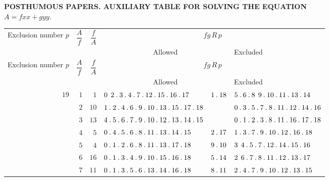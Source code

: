 \clearpage{}
\renewcommand{\BookRunningTitle}{Auxiliary Table for Solving the Equation}
\begin{center}\small
\textbf{POSTHUMOUS PAPERS. AUXILIARY TABLE FOR SOLVING THE EQUATION}\\[.4em]
$A=fxx+gyy.$
\end{center}
\begingroup\fontsize{8.7}{10.4}\selectfont\setlength{\tabcolsep}{2pt}\renewcommand{\arraystretch}{1.00}
\begin{longtable}{r|r|r|p{125pt}|p{28pt}|p{125pt}}
\hline
\shortstack{Exclusion\\number\\$p$} & $\dfrac{A}{f}$ & $\dfrac{f}{A}$ & \multicolumn{3}{c}{$fg\,R\,p$}\\\cline{4-6}
& & & \multicolumn{2}{c|}{Allowed} & Excluded\\\hline
\endfirsthead
\shortstack{Exclusion\\number\\$p$} & $\dfrac{A}{f}$ & $\dfrac{f}{A}$ & \multicolumn{3}{c}{$fg\,R\,p$}\\\cline{4-6}
& & & \multicolumn{2}{c|}{Allowed} & Excluded\\\hline
\endhead
$19$ & $1$ & $1$ & $0\mspace{8mu}2\mathbin{.} 3\mathbin{.} 4\mathbin{.} 7\mathbin{.} 12\mathbin{.} 15\mathbin{.} 16\mathbin{.} 17$ & $1\mathbin{.} 18$ & $5\mathbin{.} 6\mathbin{.} 8\mspace{8mu}9\mathbin{.} 10\mathbin{.} 11\mathbin{.} 13\mathbin{.} 14$\\
 & $2$ & $10$ & $1\mathbin{.} 2\mathbin{.} 4\mathbin{.} 6\mathbin{.} 9\mathbin{.} 10\mathbin{.} 13\mathbin{.} 15\mathbin{.} 17\mathbin{.} 18$ &  & $0\mathbin{.} 3\mathbin{.} 5\mathbin{.} 7\mathbin{.} 8\mathbin{.} 11\mathbin{.} 12\mathbin{.} 14\mathbin{.} 16$\\
 & $3$ & $13$ & $4\mathbin{.} 5\mathbin{.} 6\mathbin{.} 7\mathbin{.} 9\mathbin{.} 10\mathbin{.} 12\mathbin{.} 13\mathbin{.} 14\mathbin{.} 15$ &  & $0\mathbin{.} 1\mathbin{.} 2\mathbin{.} 3\mathbin{.} 8\mathbin{.} 11\mathbin{.} 16\mathbin{.} 17\mathbin{.} 18$\\
 & $4$ & $5$ & $0\mathbin{.} 4\mathbin{.} 5\mathbin{.} 6\mathbin{.} 8\mathbin{.} 11\mathbin{.} 13\mathbin{.} 14\mathbin{.} 15$ & $2\mathbin{.} 17$ & $1\mathbin{.} 3\mathbin{.} 7\mathbin{.} 9\mathbin{.} 10\mathbin{.} 12\mathbin{.} 16\mathbin{.} 18$\\
 & $5$ & $4$ & $0\mathbin{.} 1\mathbin{.} 2\mathbin{.} 6\mathbin{.} 8\mathbin{.} 11\mathbin{.} 13\mathbin{.} 17\mathbin{.} 18$ & $9\mathbin{.} 10$ & $3\mspace{8mu}4\mathbin{.} 5\mathbin{.} 7\mathbin{.} 12\mathbin{.} 14\mathbin{.} 15\mathbin{.} 16$\\
 & $6$ & $16$ & $0\mathbin{.} 1\mathbin{.} 3\mathbin{.} 4\mathbin{.} 9\mathbin{.} 10\mathbin{.} 15\mathbin{.} 16\mathbin{.} 18$ & $5\mathbin{.} 14$ & $2\mspace{8mu}6\mathbin{.} 7\mathbin{.} 8\mathbin{.} 11\mathbin{.} 12\mathbin{.} 13\mathbin{.} 17$\\
 & $7$ & $11$ & $0\mathbin{.} 1\mathbin{.} 3\mathbin{.} 5\mathbin{.} 6\mathbin{.} 13\mathbin{.} 14\mathbin{.} 16\mathbin{.} 18$ & $8\mathbin{.} 11$ & $2\mathbin{.} 4\mathbin{.} 7\mathbin{.} 9\mathbin{.} 10\mathbin{.} 12\mathbin{.} 13\mathbin{.} 15$\\

\end{longtable}
